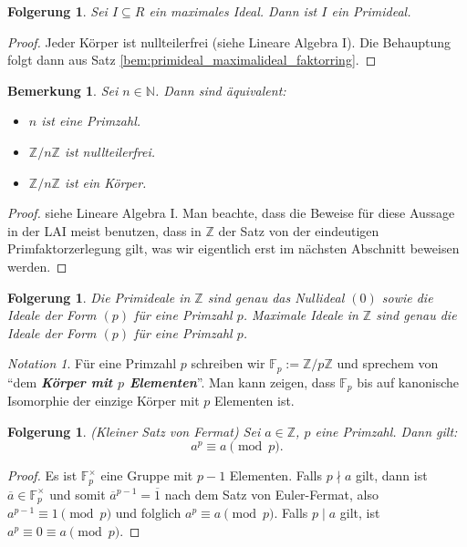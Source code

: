 \documentclass[a4paper, twoside, 11pt, ngerman]{report}
\newcommand{\FF}{\mathds F}
\newcommand{\NN}{\mathds N}
\newcommand{\ZZ}{\mathds Z}
\theoremstyle{definistyle}
\newtheorem{bem}[satz]{Bemerkung}
\newtheorem{folgerung}[satz]{Folgerung}
\theoremstyle{remark}
\newtheorem*{notation}{Notation}
\newcommand{\defn}[1]{\textit{\bfseries #1}}
\begin{document}
\begin{folgerung}\label{folgerung:max_ideal_ist_primideal}
Sei $I \subseteq R$ ein maximales Ideal. Dann ist $I$ ein Primideal.
\end{folgerung}

\begin{proof}
Jeder Körper ist nullteilerfrei (siehe Lineare Algebra I). Die Behauptung folgt dann aus Satz \ref{bem:primideal_maximalideal_faktorring}.
\end{proof}

\begin{bem}\label{bem:primzahl_und_koerper}
Sei $n \in \NN$. Dann sind äquivalent:
\begin{itemize}
    \item[(i)] $n$ ist eine Primzahl.
    \item[(ii)] $\ZZ / n\ZZ$ ist nullteilerfrei.
    \item[(iii)] $\ZZ / n\ZZ$ ist ein Körper.
\end{itemize}
\end{bem}

\begin{proof}
siehe Lineare Algebra I. Man beachte, dass die Beweise für diese Aussage in der LAI meist benutzen,
dass in $\ZZ$ der Satz von der eindeutigen Primfaktorzerlegung gilt, was wir eigentlich erst
im nächsten Abschnitt beweisen werden.
\end{proof}

\begin{folgerung}\label{folgerung:primideale_in_Z}
Die Primideale in $\ZZ$ sind genau das Nullideal $(0)$ sowie die Ideale der Form $(p)$ für eine Primzahl $p$.
Maximale Ideale in $\ZZ$ sind genau die Ideale der Form $(p)$ für eine Primzahl $p$.
\end{folgerung}

\begin{notation}
Für eine Primzahl $p$ schreiben wir $\FF_p:=\ZZ/p\ZZ$ und sprechem von "`dem \defn{Körper mit $p$ Elementen}"'.
Man kann zeigen, dass $\FF_p$ bis auf kanonische Isomorphie der einzige Körper mit $p$ Elementen ist.
\end{notation}


\begin{folgerung}\label{folgerung:kleiner_fermatscher_satz}
(Kleiner Satz von Fermat) Sei $a \in \ZZ$, $p$ eine Primzahl. Dann gilt:
\[
a^p \equiv a \pmod{p}.
\]
\end{folgerung}

\begin{proof}
Es ist $\FF_p^{\times}$ eine Gruppe mit $p - 1$ Elementen. Falls $p \nmid a$ gilt, dann ist $\overline{a} \in \FF_p^{\times}$ und somit $\overline{a}^{p - 1} = \overline{1}$ nach dem Satz von Euler-Fermat, also $a^{p - 1} \equiv 1 \pmod{p}$ und folglich $a^p \equiv a \pmod{p}$. Falls $p \mid a$ gilt, ist $a^p \equiv 0 \equiv a \pmod{p}$.
\end{proof}
\end{document}
